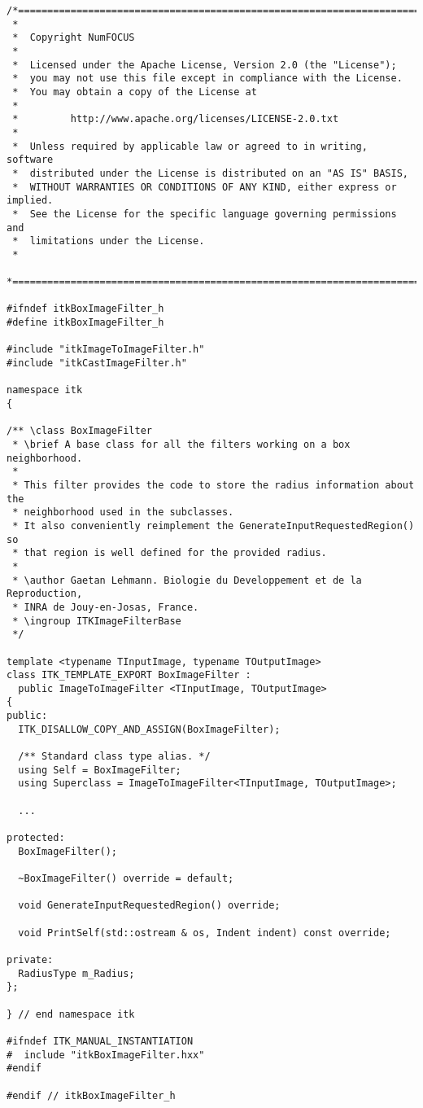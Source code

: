 \small
\begin{verbatim}
/*=========================================================================
 *
 *  Copyright NumFOCUS
 *
 *  Licensed under the Apache License, Version 2.0 (the "License");
 *  you may not use this file except in compliance with the License.
 *  You may obtain a copy of the License at
 *
 *         http://www.apache.org/licenses/LICENSE-2.0.txt
 *
 *  Unless required by applicable law or agreed to in writing, software
 *  distributed under the License is distributed on an "AS IS" BASIS,
 *  WITHOUT WARRANTIES OR CONDITIONS OF ANY KIND, either express or implied.
 *  See the License for the specific language governing permissions and
 *  limitations under the License.
 *
 *=========================================================================*/

#ifndef itkBoxImageFilter_h
#define itkBoxImageFilter_h

#include "itkImageToImageFilter.h"
#include "itkCastImageFilter.h"

namespace itk
{

/** \class BoxImageFilter
 * \brief A base class for all the filters working on a box neighborhood.
 *
 * This filter provides the code to store the radius information about the
 * neighborhood used in the subclasses.
 * It also conveniently reimplement the GenerateInputRequestedRegion() so
 * that region is well defined for the provided radius.
 *
 * \author Gaetan Lehmann. Biologie du Developpement et de la Reproduction,
 * INRA de Jouy-en-Josas, France.
 * \ingroup ITKImageFilterBase
 */

template <typename TInputImage, typename TOutputImage>
class ITK_TEMPLATE_EXPORT BoxImageFilter :
  public ImageToImageFilter <TInputImage, TOutputImage>
{
public:
  ITK_DISALLOW_COPY_AND_ASSIGN(BoxImageFilter);

  /** Standard class type alias. */
  using Self = BoxImageFilter;
  using Superclass = ImageToImageFilter<TInputImage, TOutputImage>;

  ...

protected:
  BoxImageFilter();

  ~BoxImageFilter() override = default;

  void GenerateInputRequestedRegion() override;

  void PrintSelf(std::ostream & os, Indent indent) const override;

private:
  RadiusType m_Radius;
};

} // end namespace itk

#ifndef ITK_MANUAL_INSTANTIATION
#  include "itkBoxImageFilter.hxx"
#endif

#endif // itkBoxImageFilter_h
\end{verbatim}
\normalsize

